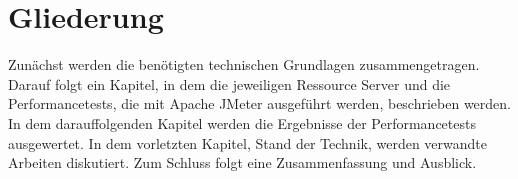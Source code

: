 %
%
\section{Gliederung}
\label{sec:intro:structure}
Zunächst werden die benötigten technischen Grundlagen zusammengetragen. Darauf folgt ein Kapitel, in dem die jeweiligen Ressource Server und die Performancetests, die mit Apache JMeter ausgeführt werden, beschrieben werden. In dem darauffolgenden Kapitel werden die Ergebnisse der Performancetests ausgewertet. In dem vorletzten Kapitel, Stand der Technik, werden verwandte Arbeiten diskutiert. Zum Schluss folgt eine Zusammenfassung und Ausblick. 
